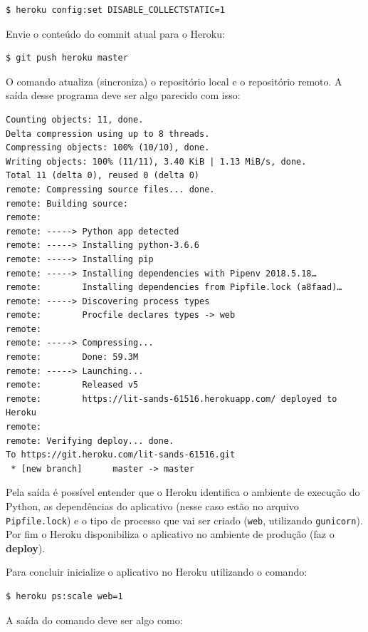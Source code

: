 \documentclass[brazil,a4paper,oneside,openright,parskip=full]{book}
\newcommand{\passthrough}[1]{#1}
\begin{document}
\begin{lstlisting}[language=sh, style=nonumber]
$ heroku config:set DISABLE_COLLECTSTATIC=1
\end{lstlisting}

Envie o conteúdo do commit atual para o Heroku:

\begin{lstlisting}[language=sh, style=nonumber]
$ git push heroku master
\end{lstlisting}

O comando atualiza (sincroniza) o repositório local e o repositório
remoto. A saída desse programa deve ser algo parecido com isso:

\begin{lstlisting}[style=nonumber]
Counting objects: 11, done.
Delta compression using up to 8 threads.
Compressing objects: 100% (10/10), done.
Writing objects: 100% (11/11), 3.40 KiB | 1.13 MiB/s, done.
Total 11 (delta 0), reused 0 (delta 0)
remote: Compressing source files... done.
remote: Building source:
remote:
remote: -----> Python app detected
remote: -----> Installing python-3.6.6
remote: -----> Installing pip
remote: -----> Installing dependencies with Pipenv 2018.5.18…
remote:        Installing dependencies from Pipfile.lock (a8faad)…
remote: -----> Discovering process types
remote:        Procfile declares types -> web
remote:
remote: -----> Compressing...
remote:        Done: 59.3M
remote: -----> Launching...
remote:        Released v5
remote:        https://lit-sands-61516.herokuapp.com/ deployed to Heroku
remote:
remote: Verifying deploy... done.
To https://git.heroku.com/lit-sands-61516.git
 * [new branch]      master -> master
\end{lstlisting}

Pela saída é possível entender que o Heroku identifica o ambiente de
execução do Python, as dependências do aplicativo (nesse caso estão no
arquivo \passthrough{\lstinline!Pipfile.lock!}) e o tipo de processo que
vai ser criado (\passthrough{\lstinline!web!}, utilizando
\passthrough{\lstinline!gunicorn!}). Por fim o Heroku disponibiliza o
aplicativo no ambiente de produção (faz o \textbf{deploy}).

Para concluir inicialize o aplicativo no Heroku utilizando o comando:

\begin{lstlisting}[language=sh, style=nonumber]
$ heroku ps:scale web=1
\end{lstlisting}

A saída do comando deve ser algo como:
\end{document}

